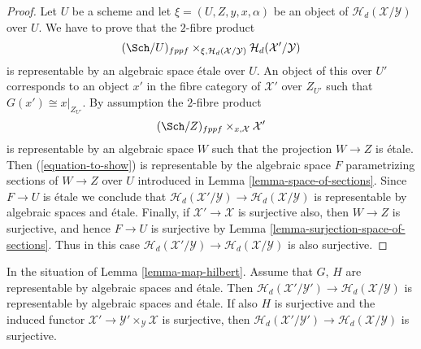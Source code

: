 \begin{proof}
Let $U$ be a scheme and let $\xi = (U, Z, y, x, \alpha)$ be an object of
$\mathcal{H}_d(\mathcal{X}/\mathcal{Y})$ over $U$.
We have to prove that the $2$-fibre product
\begin{equation}
\label{equation-to-show}
(\Sch/U)_{fppf}
\times_{\xi, \mathcal{H}_d(\mathcal{X}/\mathcal{Y})}
\mathcal{H}_d(\mathcal{X}'/\mathcal{Y})
\end{equation}
is representable by an algebraic space \'etale over $U$.
An object of this over $U'$ corresponds to an object
$x'$ in the fibre category of $\mathcal{X}'$ over $Z_{U'}$
such that $G(x') \cong x|_{Z_{U'}}$.
By assumption the $2$-fibre product
$$
(\Sch/Z)_{fppf} \times_{x, \mathcal{X}} \mathcal{X}'
$$
is representable by an algebraic space $W$ such that the projection
$W \to Z$ is \'etale. Then (\ref{equation-to-show})
is representable by the algebraic space $F$ parametrizing sections of
$W \to Z$ over $U$ introduced in
Lemma \ref{lemma-space-of-sections}.
Since $F \to U$ is \'etale we conclude that
$\mathcal{H}_d(\mathcal{X}'/\mathcal{Y}) \to
\mathcal{H}_d(\mathcal{X}/\mathcal{Y})$ is representable by
algebraic spaces and \'etale.
Finally, if $\mathcal{X}' \to \mathcal{X}$ is surjective also,
then $W \to Z$ is surjective, and hence $F \to U$ is surjective by
Lemma \ref{lemma-surjection-space-of-sections}.
Thus in this case
$\mathcal{H}_d(\mathcal{X}'/\mathcal{Y}) \to
\mathcal{H}_d(\mathcal{X}/\mathcal{Y})$ is also surjective.
\end{proof}

\begin{lemma}
\label{lemma-etale-map-hilbert}
In the situation of
Lemma \ref{lemma-map-hilbert}.
Assume that $G$, $H$ are representable by algebraic spaces and \'etale.
Then $\mathcal{H}_d(\mathcal{X}'/\mathcal{Y}') \to
\mathcal{H}_d(\mathcal{X}/\mathcal{Y})$ is representable by
algebraic spaces and \'etale.
If also $H$ is surjective and the induced functor
$\mathcal{X}' \to \mathcal{Y}' \times_\mathcal{Y} \mathcal{X}$
is surjective, then
$\mathcal{H}_d(\mathcal{X}'/\mathcal{Y}') \to
\mathcal{H}_d(\mathcal{X}/\mathcal{Y})$ is surjective.
\end{lemma}

